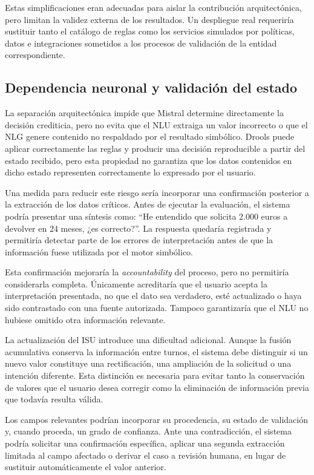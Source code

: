 \documentclass[12pt,a4paper]{report}
\begin{document}
Estas simplificaciones eran adecuadas para aislar la contribución arquitectónica, pero limitan la validez externa de los resultados. Un despliegue real requeriría sustituir tanto el catálogo de reglas como los servicios simulados por políticas, datos e integraciones sometidos a los procesos de validación de la entidad correspondiente.

\subsection{Dependencia neuronal y validación del estado}

La separación arquitectónica impide que Mistral determine directamente la decisión crediticia, pero no evita que el NLU extraiga un valor incorrecto o que el NLG genere contenido no respaldado por el resultado simbólico. Drools puede aplicar correctamente las reglas y producir una decisión reproducible a partir del estado recibido, pero esta propiedad no garantiza que los datos contenidos en dicho estado representen correctamente lo expresado por el usuario.

Una medida para reducir este riesgo sería incorporar una confirmación posterior a la extracción de los datos críticos. Antes de ejecutar la evaluación, el sistema podría presentar una síntesis como: ``He entendido que solicita 2.000 euros a devolver en 24 meses, ¿es correcto?''. La respuesta quedaría registrada y permitiría detectar parte de los errores de interpretación antes de que la información fuese utilizada por el motor simbólico.

Esta confirmación mejoraría la \textit{accountability} del proceso, pero no permitiría considerarla completa. Únicamente acreditaría que el usuario acepta la interpretación presentada, no que el dato sea verdadero, esté actualizado o haya sido contrastado con una fuente autorizada. Tampoco garantizaría que el NLU no hubiese omitido otra información relevante.

La actualización del ISU introduce una dificultad adicional. Aunque la fusión acumulativa conserva la información entre turnos, el sistema debe distinguir si un nuevo valor constituye una rectificación, una ampliación de la solicitud o una intención diferente. Esta distinción es necesaria para evitar tanto la conservación de valores que el usuario desea corregir como la eliminación de información previa que todavía resulta válida.

Los campos relevantes podrían incorporar su procedencia, su estado de validación y, cuando proceda, un grado de confianza. Ante una contradicción, el sistema podría solicitar una confirmación específica, aplicar una segunda extracción limitada al campo afectado o derivar el caso a revisión humana, en lugar de sustituir automáticamente el valor anterior.
\end{document}
